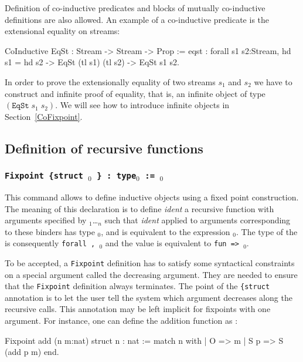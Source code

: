 Definition of co-inductive predicates and blocks of mutually
co-inductive definitions are also allowed. An example of a
co-inductive predicate is the extensional equality on streams:

\begin{coq_example}
CoInductive EqSt : Stream -> Stream -> Prop :=
    eqst :
      forall s1 s2:Stream,
        hd s1 = hd s2 -> EqSt (tl s1) (tl s2) -> EqSt s1 s2.
\end{coq_example}

In order to prove the extensionally equality of two streams $s_1$ and
$s_2$ we have to construct and infinite proof of equality, that is,
an infinite object of type $(\texttt{EqSt}\;s_1\;s_2)$. We will see
how to introduce infinite objects in Section~\ref{CoFixpoint}.

\subsection{Definition of recursive functions}

\subsubsection{\tt Fixpoint {\ident} {\params} {\tt \{struct}
  \ident$_0$ {\tt \}} : type$_0$ := \term$_0$ 
\label{Fixpoint}}

This command allows to define inductive objects using a fixed point
construction. The meaning of this declaration is to define {\it ident}
a recursive function with arguments specified by
{\binder$_1$}\ldots{\binder$_n$} such that {\it ident} applied to
arguments corresponding to these binders has type \type$_0$, and is
equivalent to the expression \term$_0$. The type of the {\ident} is
consequently {\tt forall {\params} {\tt,} \type$_0$}
and the value is equivalent to {\tt fun {\params} {\tt =>} \term$_0$}.

To be accepted, a {\tt Fixpoint} definition has to satisfy some
syntactical constraints on a special argument called the decreasing
argument. They are needed to ensure that the {\tt Fixpoint} definition
always terminates. The point of the {\tt \{struct \ident {\tt \}}}
annotation is to let the user tell the system which argument decreases
along the recursive calls. This annotation may be left implicit for
fixpoints with one argument. For instance, one can define the addition
function as :

\begin{coq_example}
Fixpoint add (n m:nat) {struct n} : nat :=
  match n with
  | O => m
  | S p => S (add p m)
  end.
\end{coq_example}

